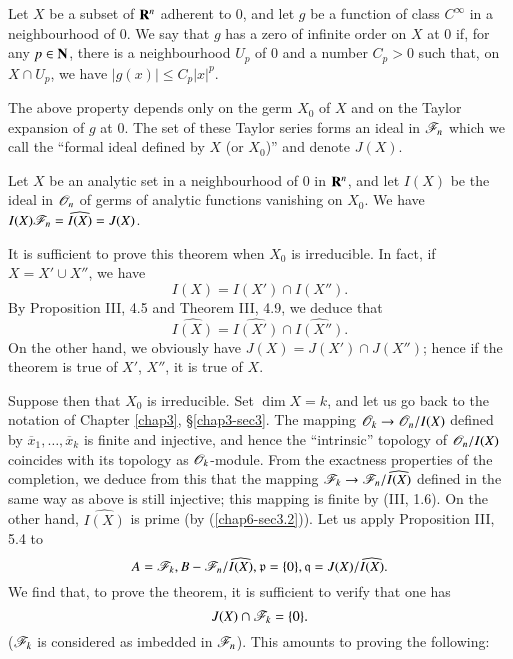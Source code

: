 \setcounter{theorem}{3}
\begin{definition}\label{chap6-defi3.4}
Let $X$ be a subset of $\mathbf{R}^{n}$ adherent to $0$, and let $g$ be a function of class $C^{\infty}$ in a neighbourhood of $0$. We say that $g$ has a zero of infinite order on $X$ at $0$ if, for any $p\in \mathbf{N}$, there is a neighbourhood $U_{p}$ of $0$ and a number $C_{p}>0$ such that, on $X\cap U_{p}$, we have $|g(x)|\leq C_{p}|x|^{p}$.
\end{definition}

The above property depends only on the germ $X_{0}$ of $X$ and on the Taylor expansion of $g$ at $0$. The set of these Taylor series forms an ideal in $\mathscr{F}_{n}$ which we call the ``formal ideal defined by $X$ (or $X_{0}$)'' and denote $J(X)$.

\begin{theorem}\label{chap6-thm3.5}
Let $X$ be an analytic set in a neighbourhood of $0$ in $\mathbf{R}^{n}$, and let $I(X)$ be the ideal in $\mathscr{O}_{n}$ of germs of analytic functions vanishing on $X_{0}$. We have $I(X)\mathscr{F}_{n}=\widehat{I(X)}=J(X)$.
\end{theorem}

It is sufficient to prove this theorem when $X_{0}$ is irreducible. In fact, if $X=X'\cup X''$, we have
$$
I(X)=I(X')\cap I(X'').
$$
By Proposition III, 4.5 and Theorem III, 4.9, we deduce that 
$$
\widehat{I(X)}=\widehat{I(X')}\cap \widehat{I(X'')}.
$$
On the other hand, we obviously have $J(X)=J(X')\cap J(X'')$; hence if the theorem is true of $X'$, $X''$, it is true of $X$.

Suppose then that $X_{0}$ is irreducible. Set $\dim X=k$, and let us go back to the notation of Chapter \ref{chap3}, \S\ref{chap3-sec3}. The mapping $\mathscr{O}_{k}\to \mathscr{O}_{n}/I(X)$ defined by $\overline{x}_{1},\ldots,\overline{x}_{k}$ is finite and injective, and hence the ``intrinsic'' topology of $\mathscr{O}_{n}/I(X)$ coincides with its topology as $\mathscr{O}_{k}$-module. From the exactness properties of the completion, we deduce from this that the mapping $\mathscr{F}_{k}\to \mathscr{F}_{n}/\widehat{I(X)}$ defined in the same way as above is still injective; this mapping is finite by (III, 1.6). On the other hand, $\widehat{I(X)}$ is prime (by (\ref{chap6-sec3.2})). Let us apply Proposition III, 5.4 to
$$
A=\mathscr{F}_{k}, B-\mathscr{F}_{n}/\widehat{I(X)}, \mathfrak{p}=\{0\}, \mathfrak{q}=J(X)/\widehat{I(X)}.
$$
We find that, to prove the theorem, it is sufficient to verify that one has
$$
J(X)\cap \mathscr{F}_{k}=\{0\}.
$$
($\mathscr{F}_{k}$ is considered as imbedded in $\mathscr{F}_{n}$). This amounts to proving the following:

